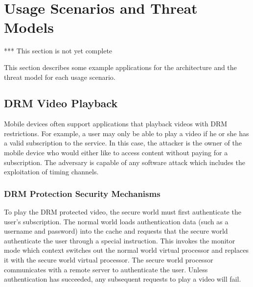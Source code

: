 \section{Usage Scenarios and Threat Models}
    *** This section is not yet complete

    This section describes some example applications for the architecture and 
    the threat model for each usage scenario.

    \subsection{DRM Video Playback}
    Mobile devices often support applications that playback videos with
    DRM restrictions. For example, a user may only be able to play a video if 
    he or she has a valid subscription to the service. In this case, the 
    attacker is the owner of the mobile device who would either like to access 
    content without paying for a subscription. The adversary is capable of any 
    software attack which includes the exploitation of timing channels.

    \subsubsection{DRM Protection Security Mechanisms}

    To play the DRM protected video, the secure world must first authenticate 
    the user's subscription. The normal world loads authentication data (such 
    as a username and password) into the cache and requests that the secure 
    world authenticate the user through a special instruction. This invokes the 
    monitor mode which context switches out the normal world virtual processor 
    and replaces it with the secure world virtual processor. The secure world 
    processor communicates with a remote server to authenticate the user.  
    Unless authentication has succeeded, any subsequent requests to play a 
    video will fail.


